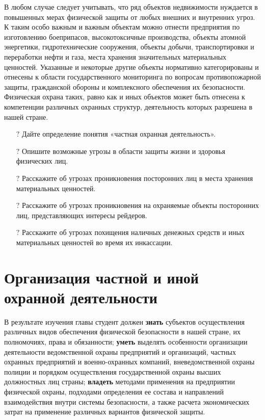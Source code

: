 \documentclass[a4paper,12pt,fleqn]{article} %
\begin{document}
В любом случае следует учитывать, что ряд объектов недвижимости нуждается в повышенных мерах физической защиты от любых внешних и внутренних угроз. К таким особо важным и важным объектам можно отнести предприятия по изготовлению боеприпасов, высокотоксичные производства, объекты атомной энергетики, гидротехнические сооружения, объекты добычи, транспортировки и переработки нефти и газа, места хранения значительных материальных ценностей. Указанные и некоторые другие объекты нормативно категорированы и отнесены к области государственного мониторинга по вопросам противопожарной защиты, гражданской обороны и комплексного обеспечения их безопасности. Физическая охрана таких, равно как и иных объектов может быть отнесена к компетенции различных охранных структур, деятельность которых разрешена в нашей стране.\\	

\begin{tcolorbox}[colback=blue!40!red!1!,colframe=blue!40!red,enforce breakable,%
	pad at break=1mm, title=Вопросы и задания для самоконтроля]
	\begin{itemize}
		\item[{\color{blue!55!red}\Huge { $ ? $}} ]  Дайте определение понятия «частная охранная деятельность».
		\item[{\color{blue!55!red}\Huge {  $ ? $}} ] Опишите возможные угрозы в области защиты жизни и здоровья физических лиц.
		\item[{\color{blue!55!red}\Huge {  $ ? $}} ] Расскажите об угрозах проникновения посторонних лиц в места хранения материальных ценностей.
		\item[{\color{blue!55!red}\Huge {  $ ? $}} ] Расскажите об угрозах проникновения на охраняемые объекты посторонних лиц, представляющих интересы рейдеров.
		\item[{\color{blue!55!red}\Huge {  $ ? $}} ] Расскажите об угрозах похищения наличных денежных средств и иных материальных ценностей во время их инкассации.		
	\end{itemize}		
\end{tcolorbox}

\section{Организация частной и иной охранной деятельности}

\begin{tcolorbox}[colback=blue!40!red!10!,colframe=blue!40!red]
В результате изучения главы студент должен \textbf{знать} субъектов осуществления различных видов обеспечения физической безопасности в нашей стране, их полномочиях, права и обязанности; \textbf{уметь} выделять особенности организации деятельности ведомственной охраны предприятий и организаций, частных охранных предприятий и военно-охранных компаний, вневедомственной охраны полиции и порядком осуществления государственной охраны высших должностных лиц страны; \textbf{владеть} методами применения на предприятии физической охраны, подходами определения ее состава и направлений взаимодействия внутри системы безопасности, а также расчета экономических затрат на применение различных вариантов физической защиты.
\end{tcolorbox}
\end{document}
